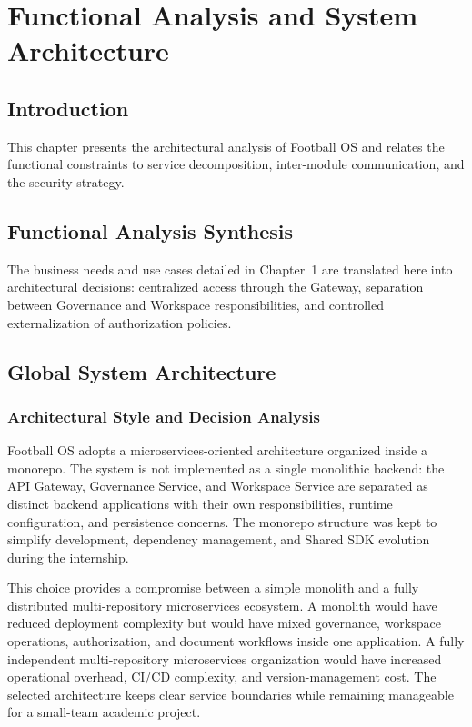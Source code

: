 ﻿%
\chapter{Functional Analysis and System Architecture}

\section*{Introduction}

This chapter presents the architectural analysis of Football OS and relates the
functional constraints to service decomposition, inter-module communication,
and the security strategy.

\section{Functional Analysis Synthesis}
The business needs and use cases detailed in Chapter~1 are translated here
into architectural decisions: centralized access through the Gateway,
separation between Governance and Workspace responsibilities, and controlled
externalization of authorization policies.

\section{Global System Architecture}

\subsection{Architectural Style and Decision Analysis}

Football OS adopts a microservices-oriented architecture organized inside a
monorepo. The system is not implemented as a single monolithic backend: the
API Gateway, Governance Service, and Workspace Service are separated as
distinct backend applications with their own responsibilities, runtime
configuration, and persistence concerns. The monorepo structure was kept to
simplify development, dependency management, and Shared SDK evolution during
the internship.

This choice provides a compromise between a simple monolith and a fully
distributed multi-repository microservices ecosystem. A monolith would have
reduced deployment complexity but would have mixed governance, workspace
operations, authorization, and document workflows inside one application. A
fully independent multi-repository microservices organization would have
increased operational overhead, CI/CD complexity, and version-management cost.
The selected architecture keeps clear service boundaries while remaining
manageable for a small-team academic project.

